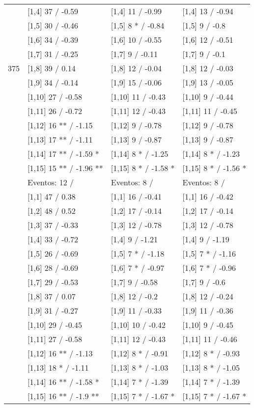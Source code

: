 \begin{table}
\begin{tabular}[t]{llll}
 & {}[1,4] 37  / -0.59 & {}[1,4] 11  / -0.99 & {}[1,4] 13  / -0.94\\
 & {}[1,5] 30  / -0.46 & {}[1,5] 8 * / -0.84 & {}[1,5] 9  / -0.8\\
 & {}[1,6] 34  / -0.39 & {}[1,6] 10  / -0.55 & {}[1,6] 12  / -0.51\\
 & {}[1,7] 31  / -0.25 & {}[1,7] 9  / -0.11 & {}[1,7] 9  / -0.1\\
375 & {}[1,8] 39  / 0.14 & {}[1,8] 12  / -0.04 & {}[1,8] 12  / -0.03\\
\addlinespace
 & {}[1,9] 34  / -0.14 & {}[1,9] 15  / -0.06 & {}[1,9] 13  / -0.05\\
 & {}[1,10] 27  / -0.58 & {}[1,10] 11  / -0.43 & {}[1,10] 9  / -0.44\\
 & {}[1,11] 26  / -0.72 & {}[1,11] 12  / -0.43 & {}[1,11] 11  / -0.45\\
 & {}[1,12] 16 ** / -1.15 & {}[1,12] 9  / -0.78 & {}[1,12] 9  / -0.78\\
 & {}[1,13] 17 ** / -1.11 & {}[1,13] 9  / -0.87 & {}[1,13] 9  / -0.87\\
\addlinespace
 & {}[1,14] 17 ** / -1.59 * & {}[1,14] 8 * / -1.25 & {}[1,14] 8 * / -1.23\\
 & {}[1,15] 15 ** / -1.96 ** & {}[1,15] 8 * / -1.58 * & {}[1,15] 8 * / -1.56 *\\
 & Eventos:  12 / & Eventos:  8 / & Eventos:  8 /\\
 & {}[1,1] 47  / 0.38 & {}[1,1] 16  / -0.41 & {}[1,1] 16  / -0.42\\
 & {}[1,2] 48  / 0.52 & {}[1,2] 17  / -0.14 & {}[1,2] 17  / -0.14\\
\addlinespace
 & {}[1,3] 37  / -0.33 & {}[1,3] 12  / -0.78 & {}[1,3] 12  / -0.78\\
 & {}[1,4] 33  / -0.72 & {}[1,4] 9  / -1.21 & {}[1,4] 9  / -1.19\\
 & {}[1,5] 26  / -0.69 & {}[1,5] 7 * / -1.18 & {}[1,5] 7 * / -1.16\\
 & {}[1,6] 28  / -0.69 & {}[1,6] 7 * / -0.97 & {}[1,6] 7 * / -0.96\\
 & {}[1,7] 29  / -0.53 & {}[1,7] 9  / -0.58 & {}[1,7] 9  / -0.6\\
\addlinespace
500 & {}[1,8] 37  / 0.07 & {}[1,8] 12  / -0.2 & {}[1,8] 12  / -0.24\\
 & {}[1,9] 31  / -0.27 & {}[1,9] 11  / -0.33 & {}[1,9] 11  / -0.36\\
 & {}[1,10] 29  / -0.45 & {}[1,10] 10  / -0.42 & {}[1,10] 9  / -0.45\\
 & {}[1,11] 27  / -0.58 & {}[1,11] 12  / -0.43 & {}[1,11] 11  / -0.46\\
 & {}[1,12] 16 ** / -1.13 & {}[1,12] 8 * / -0.91 & {}[1,12] 8 * / -0.93\\
\addlinespace
 & {}[1,13] 18 * / -1.11 & {}[1,13] 8 * / -1.03 & {}[1,13] 8 * / -1.05\\
 & {}[1,14] 16 ** / -1.58 * & {}[1,14] 7 * / -1.39 & {}[1,14] 7 * / -1.39\\
 & {}[1,15] 16 ** / -1.9 ** & {}[1,15] 7 * / -1.67 * & {}[1,15] 7 * / -1.67 *\\
\bottomrule
\end{tabular}
\end{table}
